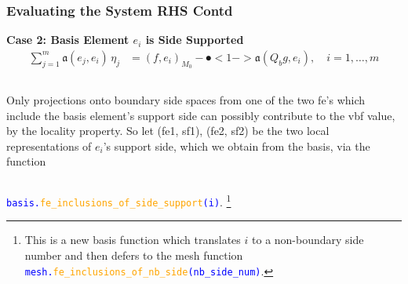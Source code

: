 \documentclass[compress]{beamer}
\begin{document}
\begin{frame}
  \frametitle{Evaluating the System RHS Contd}
  \vspace{-.25cm}
  \textbf{Case 2: Basis Element $e_i$ is Side Supported}
  \vspace{-.22cm}
  \begin{align*}
    \sum_{j=1}^m{\mathfrak{a}(e_j, e_i) \,\eta_j} &= (f, e_i)_{M_0} - \spot<1->{\mathfrak{a}(Q_b g, e_i)}, \quad i=1,\dots,m
  \end{align*}
  \begin{columns}
    Only projections onto boundary side spaces from one of the two fe's which include the basis element's support side can
    possibly contribute to the vbf value, by the locality property. So let {\small (fe1, sf1), (fe2, sf2)} be the two local
    representations of $e_i$'s support side, which we obtain from the basis, via the function
  \end{columns}
  {\small \texttt{\textcolor{blue}{basis.\textcolor{orange}{fe\_inclusions\_of\_side\_support}(i)}}}.
  \footnote{
   This is a new basis function which translates $i$ to a non-boundary side number and then defers to the mesh function
   {\scriptsize \texttt{\textcolor{blue}{mesh.\textcolor{orange}{fe\_inclusions\_of\_nb\_side}(nb\_side\_num)}}}.
  }
\end{frame}
\end{document}
